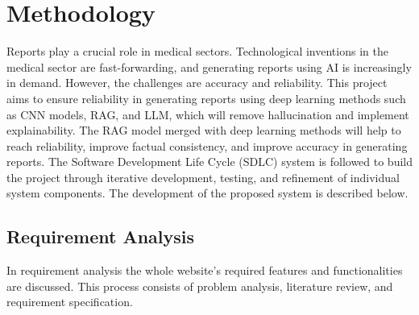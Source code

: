 

\section{Methodology}

Reports play a crucial role in medical sectors. Technological inventions in the medical sector
are fast-forwarding, and generating reports using AI is increasingly in demand. However, the
challenges are accuracy and reliability. This project aims to ensure reliability in generating
reports using deep learning methods such as CNN models, RAG, and LLM, which will remove
hallucination and implement explainability. The RAG model merged with deep learning methods
will help to reach reliability, improve factual consistency, and improve accuracy in generating
reports. The Software Development Life Cycle (SDLC) system is followed to build the project
through iterative development, testing, and refinement of individual system components. The
development of the proposed system is described below.

\subsection{Requirement Analysis}

In requirement analysis the whole website's required features and functionalities are discussed.
This process consists of problem analysis, literature review, and requirement specification.

